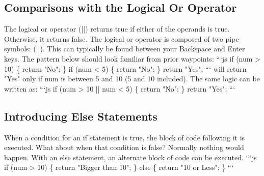 \documentclass{article}%
\begin{document}
%
\subsection{Comparisons with the Logical Or Operator}%
\label{subsec:ComparisonswiththeLogicalOrOperator}%
The logical or operator (||) returns true if either of the operands is true. Otherwise, it returns false.\newline%
The logical or operator is composed of two pipe symbols: (||). This can typically be found between your Backspace and Enter keys.\newline%
The pattern below should look familiar from prior waypoints:\newline%
```js\newline%
if (num > 10) \{\newline%
  return "No";\newline%
\}\newline%
if (num < 5) \{\newline%
  return "No";\newline%
\}\newline%
return "Yes";\newline%
```\newline%
will return "Yes" only if num is between 5 and 10 (5 and 10 included). The same logic can be written as:\newline%
```js\newline%
if (num > 10 || num < 5) \{\newline%
  return "No";\newline%
\}\newline%
return "Yes";\newline%
```\newline%

%
\subsection{Introducing Else Statements}%
\label{subsec:IntroducingElseStatements}%
When a condition for an if statement is true, the block of code following it is executed. What about when that condition is false?  Normally nothing would happen. With an else statement, an alternate block of code can be executed.\newline%
```js\newline%
if (num > 10) \{\newline%
  return "Bigger than 10";\newline%
\} else \{\newline%
  return "10 or Less";\newline%
\}\newline%
```\newline%
\end{document}
